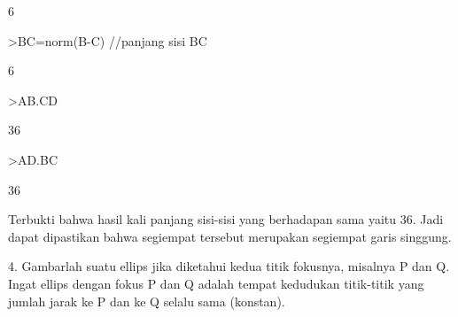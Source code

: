 \documentclass[a4paper,10pt]{article}
\begin{document}
\begin{eulernotebook}
\begin{eulercomment}
\begin{eulercomment}
\begin{euleroutput}
  6
\end{euleroutput}
\begin{eulerprompt}
>BC=norm(B-C) //panjang sisi BC
\end{eulerprompt}
\begin{euleroutput}
  6
\end{euleroutput}
\begin{eulerprompt}
>AB.CD
\end{eulerprompt}
\begin{euleroutput}
  36
\end{euleroutput}
\begin{eulerprompt}
>AD.BC
\end{eulerprompt}
\begin{euleroutput}
  36
\end{euleroutput}
\begin{eulercomment}
Terbukti bahwa hasil kali panjang sisi-sisi yang berhadapan sama yaitu
36. Jadi dapat dipastikan bahwa segiempat tersebut merupakan segiempat
garis singgung.


4. Gambarlah suatu ellips jika diketahui kedua titik fokusnya,
misalnya P dan Q. Ingat ellips dengan fokus P dan Q adalah tempat
kedudukan titik-titik yang jumlah jarak ke P dan ke Q selalu sama
(konstan).


\end{eulercomment}
\end{eulercomment}
\end{eulercomment}
\end{eulernotebook}
\end{document}
